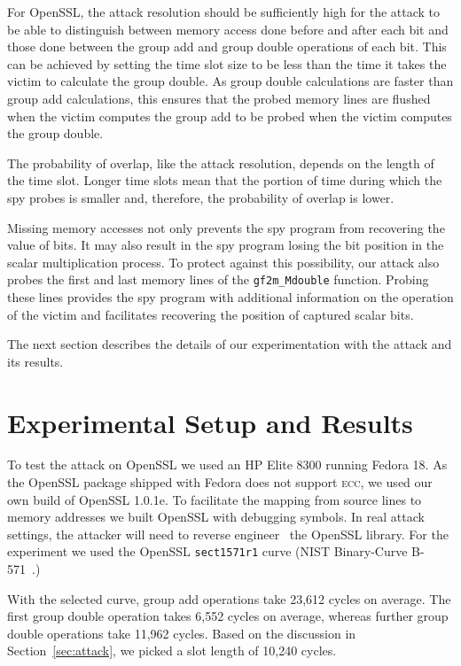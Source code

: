 \documentclass[twocolumn]{svjour3}
\begin{document}
For OpenSSL, the attack resolution should be sufficiently high for the attack to be able to distinguish between 
memory access done before and after each bit and those done between the group add and group double operations of each bit.
This can be achieved by setting the time slot size to be less than the time it takes the victim to calculate the group double.
As group double calculations are faster than group add calculations, this ensures that the probed memory lines are flushed
when the victim computes the group add to be probed when the victim computes the group double.

The probability of overlap, like the attack resolution, depends on the length of the time slot.
Longer time slots mean that the portion of time during which the spy probes is smaller and, therefore, 
the probability of overlap is lower.

Missing memory accesses not only prevents the spy program from recovering the value of bits.
It may also result in the spy program losing the bit position in the scalar multiplication process.
To protect against this possibility, our attack also probes the first and last memory lines of the 
\texttt{gf2m\_Mdouble} function.
Probing these lines provides the spy program with additional information on the operation of the victim
and facilitates recovering the position of captured scalar bits.


The next section describes the details of our experimentation with the attack and its results.


\section{Experimental Setup and Results}\label{sec:results}

To test the attack on OpenSSL we used an HP Elite 8300 
running Fedora 18.
As the OpenSSL package shipped with Fedora does not support \textsc{ecc},
we used our own build of OpenSSL 1.0.1e. 
To facilitate the mapping from source lines to memory addresses we built OpenSSL with debugging symbols.
In real attack settings, the attacker will need to reverse engineer~\cite{cipsero10software}
the OpenSSL library.
For the experiment we used the OpenSSL \texttt{sect1571r1} curve (NIST Binary-Curve B-571~\cite{fips}.)

With the selected curve, group add operations take 23,612 cycles on average.
The first group double operation takes 6,552 cycles on average, whereas further group double operations take 11,962 cycles.
Based on the discussion in Section~\ref{sec:attack}, we picked a slot length of 10,240 cycles.
\end{document}
